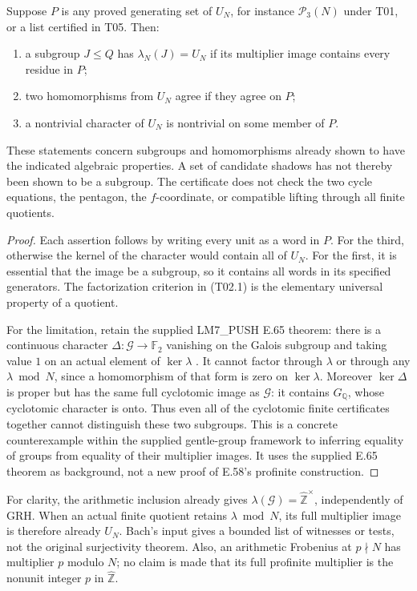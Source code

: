 \documentclass[11pt,a4paper]{article}
\begin{document}
Suppose $P$ is any proved generating set of $U_N$, for instance
$\mathcal P_3(N)$ under T01, or a list certified in T05. Then:
\begin{enumerate}
\item a subgroup $J\leq Q$ has $\lambda_N(J)=U_N$ if its multiplier
image contains every residue in $P$;
\item two homomorphisms from $U_N$ agree if they agree on $P$;
\item a nontrivial character of $U_N$ is nontrivial on some member of $P$.
\end{enumerate}
These statements concern subgroups and homomorphisms already shown to
have the indicated algebraic properties. A set of candidate shadows
has not thereby been shown to be a subgroup. The certificate does not
check the two cycle equations, the pentagon, the $f$-coordinate, or
compatible lifting through all finite quotients.

\begin{proof}
Each assertion follows by writing every unit as a word in $P$. For
the third, otherwise the kernel of the character would contain all of
$U_N$. For the first, it is essential that the image be a subgroup,
so it contains all words in its specified generators. The factorization
criterion in (T02.1) is the elementary universal property of a quotient.

For the limitation, retain the supplied LM7\_PUSH E.65 theorem:
there is a continuous character $\Delta:\mathcal G\to\mathbb F_2$
vanishing on the Galois subgroup and taking value $1$ on an actual
element of $\ker\lambda$ \cite[E.58, E.65]{LM7run}. It cannot factor
through $\lambda$ or through any $\lambda\bmod N$, since a homomorphism
of that form is zero on $\ker\lambda$. Moreover $\ker\Delta$ is proper
but has the same full cyclotomic image as $\mathcal G$: it contains
$G_{\mathbb Q}$, whose cyclotomic character is onto. Thus even all of
the cyclotomic finite certificates together cannot distinguish these
two subgroups. This is a concrete counterexample within the supplied
gentle-group framework to inferring equality of groups from equality
of their multiplier images. It uses the supplied E.65 theorem as
background, not a new proof of E.58's profinite construction.
\end{proof}

For clarity, the arithmetic inclusion already gives
$\lambda(\mathcal G)=\widehat{\mathbb Z}^{\times}$, independently of
GRH. When an actual finite quotient retains $\lambda\bmod N$, its
full multiplier image is therefore already $U_N$. Bach's input gives
a bounded list of witnesses or tests, not the original surjectivity
theorem. Also, an arithmetic Frobenius at $p\nmid N$ has multiplier
$p$ modulo $N$; no claim is made that its full profinite multiplier
is the nonunit integer $p$ in $\widehat{\mathbb Z}$.
\end{document}

